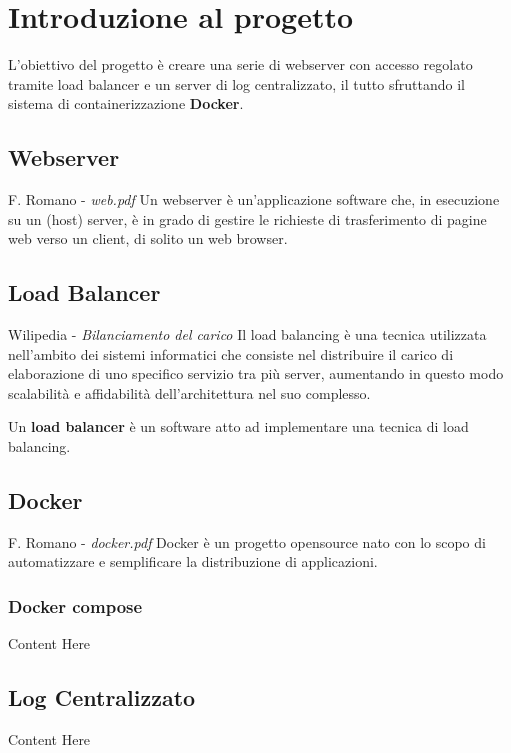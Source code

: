 \documentclass[../DocumentazioneProgetto.tex]{subfiles}
\begin{document}
	\section{Introduzione al progetto}
	L'obiettivo del progetto è creare una serie di webserver con accesso regolato tramite load balancer e un server di log centralizzato, il tutto sfruttando il sistema di containerizzazione \textbf{Docker}.
	\subsection{Webserver} 
	\begin{aquote}{F. Romano - \textit{web.pdf}}
		Un webserver è un'applicazione software che, in esecuzione su un (host) server, è in grado di gestire le richieste di trasferimento di pagine web verso un client, di solito un web browser.
	\end{aquote}
	\subsection{Load Balancer}
	\begin{aquote}{Wilipedia - \textit{Bilanciamento del carico}}
	Il load balancing è una tecnica utilizzata nell'ambito dei sistemi informatici che consiste nel distribuire il carico di elaborazione di uno specifico servizio tra più server, aumentando in questo modo scalabilità e affidabilità dell'architettura nel suo complesso.
	\end{aquote}
	Un \textbf{load balancer} è un software atto ad implementare una tecnica di load balancing. 
	\subsection{Docker} 
	\begin{aquote}{F. Romano - \textit{docker.pdf}}
		Docker è un progetto opensource nato con lo scopo di automatizzare e semplificare la distribuzione di applicazioni.
	\end{aquote}
	 
	\subsubsection{Docker compose} 
	Content Here
	\subsection{Log Centralizzato} 
	Content Here
\end{document}
